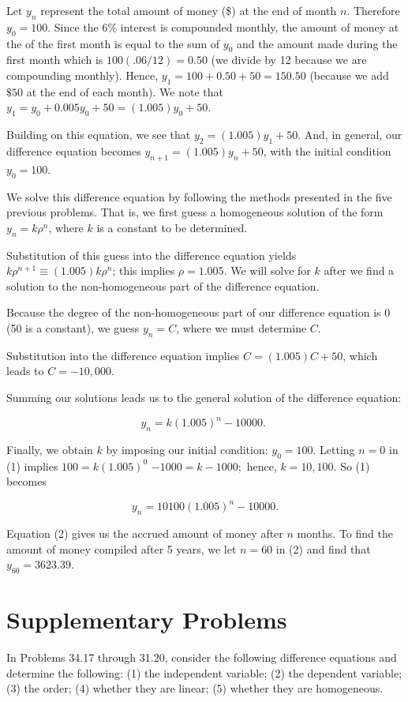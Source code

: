 \documentclass[10pt]{article}
\begin{document}
Let $y_{n}$ represent the total amount of money (\$) at the end of month $n$. Therefore $y_{0}=100$. Since the $6 \%$ interest is compounded monthly, the amount of money at the of the first month is equal to the sum of $y_{0}$ and the amount made during the first month which is $100(.06 / 12)=0.50$ (we divide by 12 because we are compounding monthly). Hence, $y_{1}=100+0.50+50=150.50$ (because we add $\$ 50$ at the end of each month). We note that $y_{1}=y_{0}+0.005 y_{0}+50=(1.005) y_{0}+50$.

Building on this equation, we see that $y_{2}=(1.005) y_{1}+50$. And, in general, our difference equation becomes $y_{n+1}=(1.005) y_{n}+50$, with the initial condition $y_{0}=100$.

We solve this difference equation by following the methods presented in the five previous problems. That is, we first guess a homogeneous solution of the form $y_{n}=k \rho^{n}$, where $k$ is a constant to be determined.

Substitution of this guess into the difference equation yields $k \rho^{n+1} \equiv(1.005) k \rho^{n}$; this implies $\rho=1.005$. We will solve for $k$ after we find a solution to the non-homogeneous part of the difference equation.

Because the degree of the non-homogeneous part of our difference equation is 0 (50 is a constant), we guess $y_{n}=C$, where we must determine $C$.

Substitution into the difference equation implies $C=(1.005) C+50$, which leads to $C=-10,000$.

Summing our solutions leads us to the general solution of the difference equation:


\begin{equation*}
y_{n}=k(1.005)^{n}-10000 \text {. } \tag{1}
\end{equation*}


Finally, we obtain $k$ by imposing our initial condition: $y_{0}=100$. Letting $n=0$ in (1) implies $100=k(1.005)^{0}$ $-1000=k-1000 ;$ hence, $k=10,100$. So (1) becomes


\begin{equation*}
y_{n}=10100(1.005)^{n}-10000 . \tag{2}
\end{equation*}


Equation (2) gives us the accrued amount of money after $n$ months. To find the amount of money compiled after 5 years, we let $n=60$ in (2) and find that $y_{60}=3623.39$.

\section*{Supplementary Problems}
In Problems 34.17 through 31.20, consider the following difference equations and determine the following: (1) the independent variable; (2) the dependent variable; (3) the order; (4) whether they are linear; (5) whether they are homogeneous.
\end{document}
